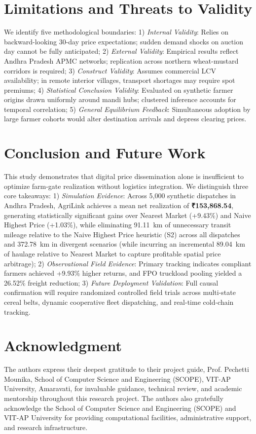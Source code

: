 \documentclass[journal]{IEEEtran}
\begin{document}
\section{Limitations and Threats to Validity}
We identify five methodological boundaries: 1) \textit{Internal Validity}: Relies on backward-looking 30-day price expectations; sudden demand shocks on auction day cannot be fully anticipated; 2) \textit{External Validity}: Empirical results reflect Andhra Pradesh APMC networks; replication across northern wheat-mustard corridors is required; 3) \textit{Construct Validity}: Assumes commercial LCV availability; in remote interior villages, transport shortages may require spot premiums; 4) \textit{Statistical Conclusion Validity}: Evaluated on synthetic farmer origins drawn uniformly around mandi hubs; clustered inference accounts for temporal correlation; 5) \textit{General Equilibrium Feedback}: Simultaneous adoption by large farmer cohorts would alter destination arrivals and depress clearing prices.

\section{Conclusion and Future Work}
This study demonstrates that digital price dissemination alone is insufficient to optimize farm-gate realization without logistics integration. We distinguish three core takeaways: 1) \textit{Simulation Evidence}: Across 5,000 synthetic dispatches in Andhra Pradesh, AgriLink achieves a mean net realization of \textbf{₹153,868.54}, generating statistically significant gains over Nearest Market (+9.43\%) and Naive Highest Price (+1.03\%), while eliminating 91.11~km of unnecessary transit mileage relative to the Naive Highest Price heuristic (S2) across all dispatches and 372.78~km in divergent scenarios (while incurring an incremental 89.04~km of haulage relative to Nearest Market to capture profitable spatial price arbitrage); 2) \textit{Observational Field Evidence}: Primary tracking indicates compliant farmers achieved +9.93\% higher returns, and FPO truckload pooling yielded a 26.52\% freight reduction; 3) \textit{Future Deployment Validation}: Full causal confirmation will require randomized controlled field trials across multi-state cereal belts, dynamic cooperative fleet dispatching, and real-time cold-chain tracking.

\section*{Acknowledgment}
The authors express their deepest gratitude to their project guide, Prof. Pechetti Mounika, School of Computer Science and Engineering (SCOPE), VIT-AP University, Amaravati, for invaluable guidance, technical review, and academic mentorship throughout this research project. The authors also gratefully acknowledge the School of Computer Science and Engineering (SCOPE) and VIT-AP University for providing computational facilities, administrative support, and research infrastructure.
\end{document}
